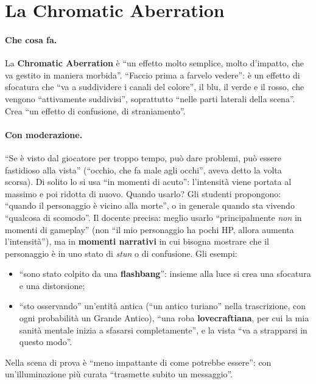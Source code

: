 \section{La Chromatic Aberration}
\label{ue16:sec:chromatic}

\paragraph{Che cosa fa.} La \textbf{Chromatic Aberration} è ``un effetto molto semplice, molto
d'impatto, che va gestito in maniera morbida''. ``Faccio prima a farvelo vedere'': è un effetto
di sfocatura che ``va a suddividere i canali del colore'', il blu, il verde e il rosso, che
vengono ``attivamente suddivisi'', soprattutto ``nelle parti laterali della scena''. Crea
``un effetto di confusione, di straniamento''.

\paragraph{Con moderazione.} ``Se è visto dal giocatore per troppo tempo, può dare problemi,
può essere fastidioso alla vista'' (``occhio, che fa male agli occhi'', aveva detto la volta
scorsa). Di solito lo si usa ``in momenti di acuto'': l'intensità viene portata al massimo e
poi ridotta di nuovo. Quando usarlo? Gli studenti propongono: ``quando il personaggio è
vicino alla morte'', o in generale quando sta vivendo ``qualcosa di scomodo''. Il docente
precisa: meglio usarlo ``principalmente \emph{non} in momenti di gameplay'' (non ``il mio
personaggio ha pochi HP, allora aumenta l'intensità''), ma in \textbf{momenti narrativi} in
cui bisogna mostrare che il personaggio è in uno stato di \emph{stun} o di confusione. Gli
esempi:
\begin{itemize}
  \item ``sono stato colpito da una \textbf{flashbang}'': insieme alla luce si crea una
        sfocatura e una distorsione;
  \item ``sto osservando'' un'entità antica (``un antico turiano'' nella trascrizione, con
        ogni probabilità un Grande Antico), ``una roba \textbf{lovecraftiana}, per cui la mia
        sanità mentale inizia a sfasarsi completamente'', e la vista ``va a strapparsi in
        questo modo''.
\end{itemize}
Nella scena di prova è ``meno impattante di come potrebbe essere'': con un'illuminazione più
curata ``trasmette subito un messaggio''.

